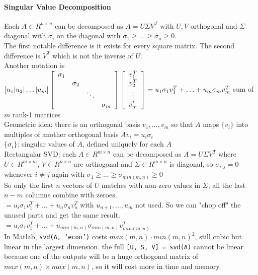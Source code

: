 \documentclass[10pt]{report}
\begin{document}
\paragraph{Singular Value Decomposition} Each $A\in R^{n\times n}$ can be decomposed as $A = U\Sigma V^T$ with $U, V$ orthogonal and $\Sigma$ diagonal with $\sigma_i$ on the diagonal with $\sigma_1 \geq \ldots \geq \sigma_n \geq 0$.\\
The first notable difference is it exists for every square matrix. The second difference is $V^T$ which is not the inverse of $U$.\\
Another notation is $[u_1|u_2|\ldots|u_m]\left[\begin{array}{c c c c}
\sigma_1\\ & \sigma_2\\ & & \ddots\\ & & & \sigma_m
\end{array} \right]\left[\begin{array}{c}
v_1^T\\v_2^T\\\vdots\\v_m^t
\end{array} \right] = u_1\sigma_1 v_1^T + \ldots + u_m\sigma_m v_m^T$ sum of $m$ rank-1 matrices\\
Geometric idea: there is an orthogonal basis $v_1,\ldots, v_m$ so that $A$ maps $\{v_i\}$ into multiples of another orthogonal basis $A v_i = u_i \sigma_i$\\
$\{\sigma_i\}$: singular values of $A$, defined uniquely for each $A$\\
Rectangular SVD: each $A\in R^{m\times n}$ can be decomposed as $A = U\Sigma V^T$ where $U\in R^{m\times m}$, $V \in R^{n\times n}$ are orthogonal and $\Sigma\in R^{m\times n}$ is diagonal, so $\sigma_{i,j} = 0$ whenever $i\neq j$ again with $\sigma_1 \geq \ldots \geq \sigma_{min(m, n)} \geq 0$\\
So only the first $n$ vectors of $U$ matches with non-zero values in $\Sigma$, all the last $n-m$ columns combine with zeroes.\\
$= u_i\sigma_1 v_1^T + \ldots + u_n \sigma_n v_n^T$ with $u_{n+1},\ldots, u_m$ not used. So we can "chop off" the unused parts and get the same result.\\
$= u_i\sigma_1 v_1^T + \ldots + u_{min(m, n)} \sigma_{min(m, n)} v_{min(m, n)}^T$\\
In Matlab, \texttt{svd(A, 'econ')} costs $max(m,n)\cdot min(m,n)^2$, still cubic but linear in the largest dimension. the full \texttt{[U, S, V] = svd(A)} cannot be linear because one of the outputs will be a huge orthogonal matrix of $max(m,n)\times max(m,n)$, so it will cost more in time and memory.\\\\
\end{document}
